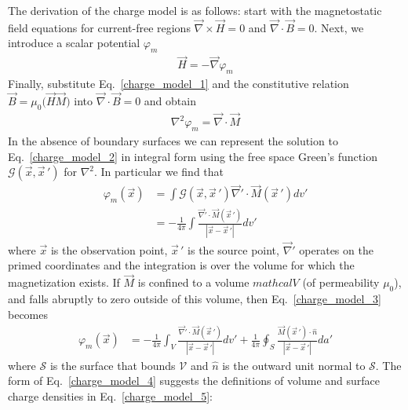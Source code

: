\documentclass[11pt,a4paper,oneside]{book}
\numberwithin{equation}{section}
\newcommand{\abs}[1]{\left|#1\right|}
\theoremstyle{it}
\theoremstyle{definition}
\begin{document}
The derivation of the charge model is as follows: start with the magnetostatic field equations for current-free regions $\vec{\nabla}\times\vec{H}=0$ and $\vec{\nabla}\cdot\vec{B}=0$. Next, we introduce a scalar potential $\varphi_m$
 \begin{equation}\label{charge_model_1}
	\boxed{	\begin{aligned}
		\vec{H} = -\vec{\nabla}\varphi_m
	\end{aligned}}
\end{equation}
Finally, substitute Eq.~\eqref{charge_model_1} and the constitutive relation $\vec{B}=\mu_0\Big(\vec{H}\vec{M}\Big)$ into $\vec{\nabla}\cdot\vec{B}=0$ and obtain
 \begin{equation}\label{charge_model_2}
	\begin{aligned}
			\nabla^2\varphi_m=\vec{\nabla}\cdot\vec{M}
	\end{aligned}
\end{equation}
In the absence of boundary surfaces we can represent the solution to Eq.~\eqref{charge_model_2} in integral form using the free space Green's function $\mathcal{G}(\vec{x},\vec{x}\,')$ for $\nabla^2$. In particular we find that 
\begin{equation}\label{charge_model_3}
	\begin{aligned}
		\varphi_m(\vec{x})&=\int\mathcal{G}(\vec{x},\vec{x}\,')\vec{\nabla}'\cdot\vec{M}(\vec{x}\,')dv' \\[6pt]
		&=-\frac{1}{4\pi}\int\frac{\vec{\nabla}'\cdot\vec{M}(\vec{x}\,')}{\abs{\vec{x}-\vec{x}\,'}}dv'
	\end{aligned}
\end{equation}
where $\vec{x}$ is the observation point, $\vec{x}\,'$ is the source point, $\vec{\nabla}'$ operates on the primed coordinates and the integration is over the volume for which the magnetization exists. If $\vec{M}$ is confined to a volume $mathcal{V}$ (of permeability $\mu_0$), and falls abruptly to zero outside of this volume, then Eq.~\eqref{charge_model_3} becomes
\begin{equation}\label{charge_model_4}
	\begin{aligned}
		\varphi_m(\vec{x}) &= -\frac{1}{4\pi} \int_{V} \frac{\vec{\nabla}'\cdot\vec{M}(\vec{x}\,')}{\abs{\vec{x}-\vec{x}\,'}}dv' + 
		\frac{1}{4\pi}\oint_{S}\frac{\vec{M}(\vec{x}\,') \cdot \hat{n}}{\abs{\vec{x}-\vec{x}\,'}}da'
		\end{aligned}
		\end{equation}
where $\mathcal{S}$ is the surface that bounds $\mathcal{V}$ and $\hat{n}$ is the outward unit normal to $\mathcal{S}$. The form of Eq.~\eqref{charge_model_4} suggests the definitions of volume and surface charge densities in Eq.~\eqref{charge_model_5}:
\end{document}
